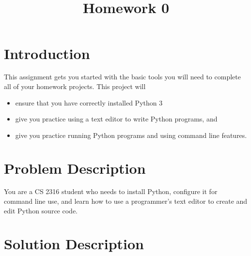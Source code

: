 \documentclass[12pt]{article}
\title{Homework 0}
\author{}
\date{}
\begin{document}
\maketitle
\vspace{-1in}
\section{Introduction}

This assignment gets you started with the basic tools you will need to complete all of your homework projects.  This project will
\begin{itemize}
\itemsep0em
\item ensure that you have correctly installed Python 3
\item give you practice using a text editor to write Python programs, and
\item give you practice running Python programs and using command line features.
\end{itemize}

\section{Problem Description}

You are a CS 2316 student who needs to install Python, configure it for command line use, and learn how to use a programmer's text editor to create and edit Python source code.

\section{Solution Description}
\end{document}
